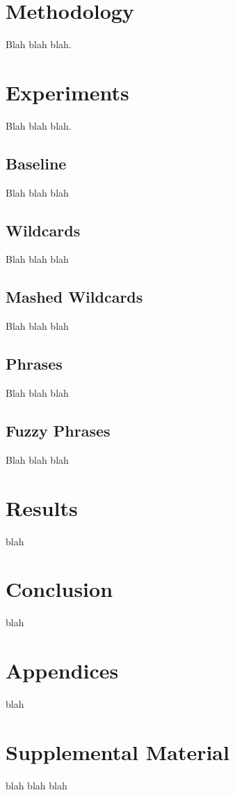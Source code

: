 \documentclass[11pt,a4paper]{article}
\begin{document}
\section{Methodology}

Blah blah blah.

\section{Experiments}

Blah blah blah.

\subsection{Baseline}

Blah blah blah

\subsection{Wildcards}

Blah blah blah

\subsection{Mashed Wildcards}

Blah blah blah

\subsection{Phrases}

Blah blah blah

\subsection{Fuzzy Phrases}

Blah blah blah

\section{Results}

blah

\section{Conclusion}

blah




\appendix

\section{Appendices}
\label{sec:appendix}

blah 

\section{Supplemental Material}
\label{sec:supplemental}
blah blah blah
\end{document}
